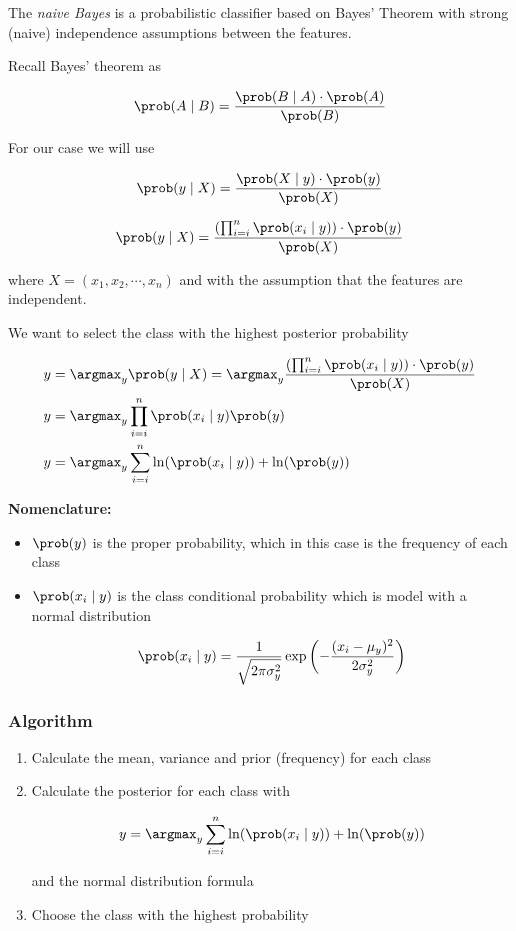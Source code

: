 The \emph{naive Bayes} is a probabilistic classifier based on Bayes' Theorem with strong (naive)
independence assumptions between the features.

Recall Bayes' theorem as

\[
    \prob(A \mid B) = \frac{\prob(B \mid A) \cdot \prob(A)}{\prob(B)}
\]

For our case we will use 

\[
    \prob(y \mid X) = \frac{\prob(X \mid y) \cdot \prob(y)}{\prob(X)}
\]

\[
    \prob(y \mid X) = \frac{\left(\prod_{i = i }^{n} \prob(x_i \mid y) \right) \cdot \prob(y)}{\prob(X)}
\]


where \(X = (x_1, x_2, \cdots, x_n)\) and with the assumption that the features are independent.

We want to select the class with the highest posterior probability

\begin{align*} 
    y &= \argmax_y  \prob(y \mid X) = \argmax_y \frac{\left(\prod_{i = i }^{n} \prob(x_i \mid y) \right) \cdot \prob(y)}{\prob(X)} \\ 
    y &= \argmax_y \prod_{i = i }^{n} \prob(x_i \mid y) \prob(y) \\ 
    y &= \argmax_y \sum_{i = i }^{n} \ln(\prob(x_i \mid y)) + \ln(\prob(y)) 
\end{align*}

\textbf{Nomenclature:}

\begin{itemize}

    \item \(\prob(y)\) is the proper probability, which in this case is the frequency of each class 

    \item  \(\prob(x_i \mid y)\) is the class conditional probability which is model with a normal distribution

    \[
        \prob(x_i \mid y) = \frac{1}{\sqrt{2\pi \sigma_y^2}} \exp\left(- \frac{(x_i - \mu_y)^2}{2 \sigma_y^2}\right)
    \]

\end{itemize}

\subsubsection*{Algorithm}

\begin{enumerate}

    \item Calculate the mean, variance and prior (frequency) for each class

    \item Calculate the posterior for each class with 
   
    \[ 
        y = \argmax_y \sum_{i = i }^{n} \ln(\prob(x_i \mid y)) + \ln(\prob(y)) 
    \]

    and the normal distribution formula 

    \item Choose the class with the highest probability

\end{enumerate}

